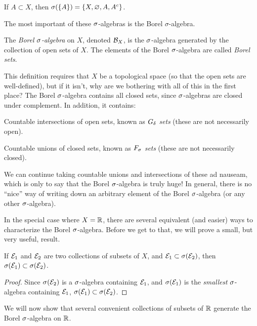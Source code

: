 \documentclass[main.tex]{subfiles}
\begin{document}
\begin{example}If $A \subset X$, then ${\sigma}(\{A\}) = \{ X, \varnothing, A, A^c \}$.
\end{example}

The most important of these ${\sigma}$-algebras is the Borel $\sigma$-algebra.

\begin{definition}
The \emph{Borel ${\sigma}$-algebra} on $X$, denoted ${\mathcal B}_X$, is the ${\sigma}$-algebra generated by the collection of open sets of $X$. The elements of the Borel ${\sigma}$-algebra are called \emph{Borel sets}.
\end{definition}

This definition requires that $X$ be a topological space (so that the open sets are well-defined), but if it isn't, why are we bothering with all of this in the first place? The Borel ${\sigma}$-algebra contains all closed sets, since ${\sigma}$-algebras are closed under complement. In addition, it contains:
\begin{bulletlist}
	\item Countable intersections of open sets, known as \emph{$G_\delta$ sets} (these are not necessarily open).
	\item Countable unions of closed sets, known as \emph{$F_{\sigma}$ sets} (these are not necessarily closed).
\end{bulletlist}
We can continue taking countable unions and intersections of these ad nauseam, which is only to say that the Borel ${\sigma}$-algebra is truly huge! In general, there is no ``nice'' way of writing down an arbitrary element of the Borel ${\sigma}$-algebra (or any other ${\sigma}$-algebra). 

In the special case where $X = {\mathbb R}$, there are several equivalent (and easier) ways to characterize the Borel ${\sigma}$-algebra. Before we get to that, we will prove a small, but very useful, result.

\begin{proposition}\label{prop:salggen}
If ${\mathcal E}_1$ and ${\mathcal E}_2$ are two collections of subsets of $X$, and ${\mathcal E}_1 \subset {\sigma}({\mathcal E}_2)$, then ${\sigma}({\mathcal E}_1) \subset {\sigma}({\mathcal E}_2)$.
\begin{proof}
Since ${\sigma}({\mathcal E}_2)$ is a ${\sigma}$-algebra containing ${\mathcal E}_1$, and ${\sigma}({\mathcal E}_1)$ is the \emph{smallest} ${\sigma}$-algebra containing ${\mathcal E}_1$, ${\sigma}({\mathcal E}_1) \subset {\sigma}({\mathcal E}_2)$.
\end{proof}
\end{proposition}

We will now show that several convenient collections of subsets of ${\mathbb R}$ generate the Borel ${\sigma}$-algebra on ${\mathbb R}$.
\end{document}
